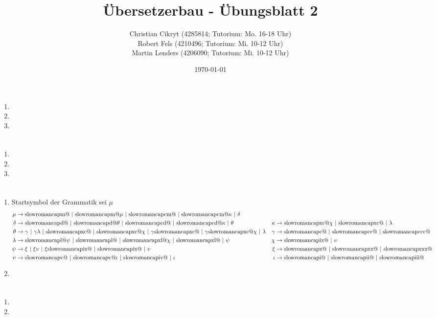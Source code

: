 \documentclass[a4paper,10pt]{scrartcl}
\title{Übersetzerbau - Übungsblatt 2}
\author{Christian Cikryt (4285814; Tutorium: Mo. 16-18 Uhr)\\
  Robert Fels (4210496; Tutorium: Mi. 10-12 Uhr)\\
  Martin Lenders (4206090; Tutorium: Mi. 10-12 Uhr)
  }
\date{\today}
\makeatletter
\newcommand{\Rm}[1]{\textrm{\expandafter\@slowromancap\romannumeral #1@}}
\makeatother
\begin{document}
\maketitle

\section{}
\begin{enumerate}
 \item  
 \item  
 \item	
\end{enumerate}

\section{}
\begin{enumerate}
 \item  
 \item	
 \item	
\end{enumerate}

\section{}


\section{}
\begin{enumerate}
 \item  Startsymbol der Grammatik sei $\mu$
        \begin{align*}
         \mu &\to \Rm{1000}\ |\ \Rm{1000}\mu\ |\ \Rm{900}\ |\ \Rm{900}\kappa\ |\ \delta && \\
         \delta &\to \Rm{500}\ |\ \Rm{500}\theta\ |\ \Rm{400}\ |\ \Rm{400}\kappa\ |\ \theta &
            \kappa &\to \Rm{90}\chi\ |\ \Rm{90}\ |\ \lambda \\
        \theta &\to \gamma\ |\ \gamma\lambda\ |\ \Rm{90}\ |\ \Rm{90}\chi\ |\ \gamma \Rm{90}\ |\ \gamma \Rm{90}\chi\ |\ \lambda &
            \gamma &\to \Rm{100}\ |\ \Rm{200}\ |\ \Rm{300} \\
        \lambda &\to \Rm{50}\psi\ |\ \Rm{50}\ |\ \Rm{40}\chi\ |\ \Rm{40}\ |\ \psi &
            \chi &\to \Rm{9}\ |\ \upsilon \\
        \psi &\to \xi\ |\ \xi\upsilon\ |\ \xi \Rm{9}\ |\ \Rm{9}\ |\ \upsilon &
            \xi &\to \Rm{10}\ |\ \Rm{20}\ |\ \Rm{30} \\
        \upsilon &\to \Rm{5}\ |\ \Rm{5}\iota\ |\ \Rm{4}\ |\ \iota &
            \iota &\to \Rm{1}\ |\ \Rm{2}\ |\ \Rm{3}
        \end{align*}
 \item  
\end{enumerate}

\section{}
\begin{enumerate}
 \item  
 \item  
\end{enumerate}
\end{document}
